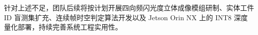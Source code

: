 针对上述不足，团队后续将按计划开展四向频闪光度立体成像模组研制、实体工件 ID 盲测集扩充、连续帧时空判定算法开发以及 Jetson Orin NX 上的 INT8 深度量化部署，持续完善系统工程实用性。


